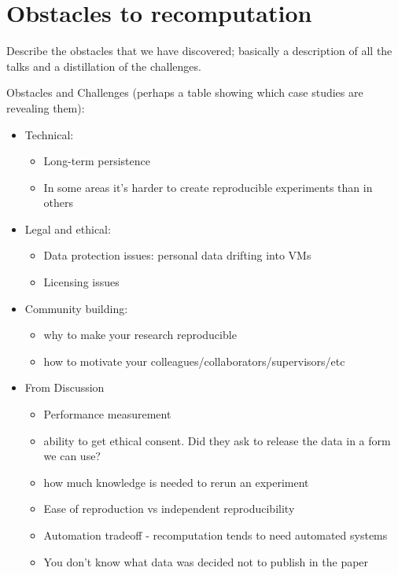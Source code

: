 \section{Obstacles to recomputation}
\label{s:obstacles}

Describe the obstacles that we have discovered; basically a
description of all the talks and a distillation of the challenges.

Obstacles and Challenges (perhaps a table showing which case studies
are revealing them):

\begin{itemize}
\item Technical:
 \begin{itemize}
  \item Long-term persistence
  \item In some areas it's harder to create reproducible experiments than in others
\end{itemize}

\item
Legal and ethical:

\begin{itemize}
  \item Data protection issues: personal data drifting into VMs
  \item Licensing issues
  \end{itemize}
  

\item
Community building:

\begin{itemize}
\item
  why to make your research reproducible
  \item how to motivate your colleagues/collaborators/supervisors/etc
  \end{itemize}
\item From Discussion
\begin{itemize} 

\item Performance measurement
\item ability to get ethical consent.  Did they ask to release the data in a form we can use?
\item how much knowledge is needed to rerun an experiment
\item Ease of reproduction vs independent reproducibility
\item Automation tradeoff - recomputation tends to need automated systems
\item You don't know what data was decided not to publish in the paper 
  \end{itemize}

  
\end{itemize}



